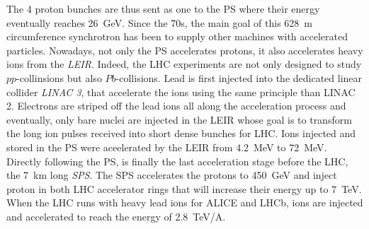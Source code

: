	The 4 proton bunches are thus sent as one to the PS where their energy eventually reaches \SI{26}{GeV}. Since the 70s, the main goal of this \SI{628}{m} circumference synchrotron has been to supply other machines with accelerated particles. Nowadays, not only the PS accelerates protons, it also accelerates heavy ions from the \textit{\acf{LEIR}}. Indeed, the LHC experiments are not only designed to study $pp$-collinsions but also $Pb$-collisions. Lead is first injected into the dedicated linear collider \textit{LINAC 3}, that accelerate the ions using the same principle than LINAC 2. Electrons are striped off the lead ions all along the acceleration process and eventually, only bare nuclei are injected in the LEIR whose goal is to transform the long ion pulses received into short dense bunches for LHC. Ions injected and stored in the PS were aceelerated by the LEIR from \SI{4.2}{MeV} to \SI{72}{MeV}.\\
	
	Directly following the PS, is finally the last acceleration stage before the LHC, the \SI{7}{km} long \textit{SPS}. The SPS accelerates the protons to \SI{450}{GeV} and inject proton in both LHC accelerator rings that will increase their energy up to \SI{7}{TeV}. When the LHC runs with heavy lead ions for ALICE and LHCb, ions are injected and accelerated to reach the energy of \SI{2.8}{TeV/A}.

